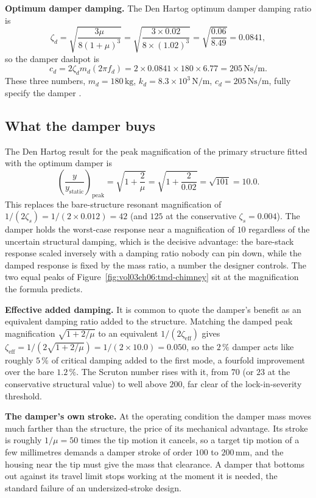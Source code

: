 \textbf{Optimum damper damping.} The Den Hartog optimum damper damping
ratio is
\[
\zeta_d = \sqrt{\frac{3\mu}{8(1 + \mu)^3}} = \sqrt{\frac{3\times 0.02}{
8\times (1.02)^3}} = \sqrt{\frac{0.06}{8.49}} = 0.0841,
\]
so the damper dashpot is
\[
c_d = 2\zeta_d m_d(2\pi f_d) = 2\times 0.0841\times 180\times 6.77 =
205\,\si{\newton\second\per\meter}.
\]
These three numbers, $m_d = 180\,\si{\kilogram}$, $k_d = 8.3\times
10^3\,\si{\newton\per\meter}$, $c_d = 205\,\si{\newton\second\per\meter}$,
fully specify the damper \cite{text:den-hartog-vibrations}.

\subsection{What the damper buys}

The Den Hartog result for the peak magnification of the primary
structure fitted with the optimum damper is
\[
\left(\frac{y}{y_{\text{static}}}\right)_{\text{peak}} = \sqrt{1 +
\frac{2}{\mu}} = \sqrt{1 + \frac{2}{0.02}} = \sqrt{101} = 10.0.
\]
This replaces the bare-structure resonant magnification of $1/(2\zeta_s)
= 1/(2\times 0.012) = 42$ (and $125$ at the conservative $\zeta_s =
0.004$). The damper holds the worst-case response near a magnification
of $10$ regardless of the uncertain structural damping, which is the
decisive advantage: the bare-stack response scaled inversely with a
damping ratio nobody can pin down, while the damped response is fixed by
the mass ratio, a number the designer controls. The two equal peaks of
Figure~\ref{fig:vol03ch06:tmd-chimney} sit at the magnification the
formula predicts.

\textbf{Effective added damping.} It is common to quote the damper's
benefit as an equivalent damping ratio added to the structure. Matching
the damped peak magnification $\sqrt{1 + 2/\mu}$ to an equivalent
$1/(2\zeta_{\text{eff}})$ gives $\zeta_{\text{eff}} = 1/(2\sqrt{1 +
2/\mu}) = 1/(2\times 10.0) = 0.050$, so the $2\,\%$ damper acts like
roughly $5\,\%$ of critical damping added to the first mode, a fourfold
improvement over the bare $1.2\,\%$. The Scruton number rises with it,
from $70$ (or $23$ at the conservative structural value) to well above
$200$, far clear of the lock-in-severity threshold.

\textbf{The damper's own stroke.} At the operating condition the damper
mass moves much farther than the structure, the price of its
mechanical advantage.
Its stroke is roughly $1/\mu = 50$ times the tip motion it cancels, so a
target tip motion of a few millimetres demands a damper stroke of order
$100$ to $200\,\si{\milli\meter}$, and the housing near the tip must give
the mass that clearance. A damper that bottoms out against its travel
limit stops working at the moment it is needed, the standard failure of
an undersized-stroke design.

